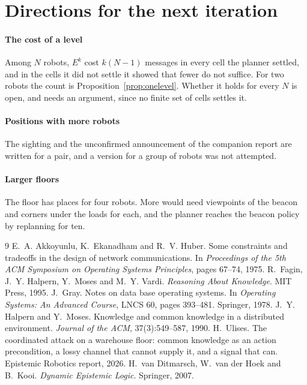 \documentclass[11pt,a4paper]{article}
\theoremstyle{definition}
\begin{document}
\section{Directions for the next iteration}
\label{sec:next}

\paragraph{The cost of a level} Among $N$ robots, $E^k$ cost $k(N-1)$ messages
in every cell the planner settled, and in the cells it did not settle it showed
that fewer do not suffice. For two robots the count is
Proposition~\ref{prop:onelevel}. Whether it holds for every $N$ is open, and
needs an argument, since no finite set of cells settles it.

\paragraph{Positions with more robots} The sighting and the unconfirmed
announcement of the companion report are written for a pair, and a version for
a group of robots was not attempted.

\paragraph{Larger floors} The floor has places for four robots. More would need
viewpoints of the beacon and corners under the loads for each, and the planner
reaches the beacon policy by replanning for ten.

\begin{thebibliography}{9}
 E.~A. Akkoyunlu, K.~Ekanadham and R.~V. Huber.
  Some constraints and tradeoffs in the design of network communications.
  In \emph{Proceedings of the 5th ACM Symposium on Operating Systems
  Principles}, pages 67--74, 1975.
 R.~Fagin, J.~Y. Halpern, Y.~Moses and M.~Y. Vardi.
  \emph{Reasoning About Knowledge}. MIT Press, 1995.
 J.~Gray.
  Notes on data base operating systems.
  In \emph{Operating Systems: An Advanced Course}, LNCS 60, pages 393--481.
  Springer, 1978.
 J.~Y. Halpern and Y.~Moses.
  Knowledge and common knowledge in a distributed environment.
  \emph{Journal of the ACM}, 37(3):549--587, 1990.
 H.~Ulises.
  The coordinated attack on a warehouse floor: common knowledge as an action
  precondition, a lossy channel that cannot supply it, and a signal that can.
  Epistemic Robotics report, 2026.
 H.~van Ditmarsch, W.~van der Hoek and B.~Kooi.
  \emph{Dynamic Epistemic Logic}. Springer, 2007.
\end{thebibliography}
\end{document}
